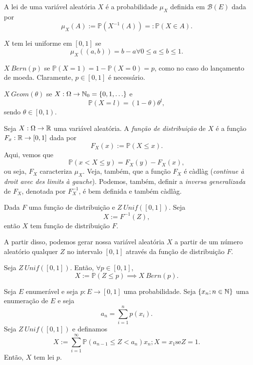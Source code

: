 A lei de uma variável aleatória $X$ é a probabilidade $\mu_X$ definida em $\mathcal{B}\left( E \right) $ dada por \[
\mu_X\left( A \right) := \mathbb{P}\left( X^{-1}\left( A \right)  \right) =: \mathbb{P}\left( X\in A \right) 
.\] 

\begin{eg}
    $X$ tem lei uniforme em $\left[ 0,1 \right] $ se \[
	\mu_X\left( (a,b) \right) = b-a \forall 0\le a\le b\le 1
    .\]
\end{eg}
\begin{eg}
    $X~Bern\left( p \right) $ se $ \mathbb{P}\left( X=1 \right) =1- \mathbb{P}\left( X=0 \right) =p$, como no caso do lançamento de moeda. Claramente, $p \in [0,1] $ é necessário.
\end{eg}
\begin{eg}
    $X ~ Geom\left( \theta \right) $ se $X:\Omega \to \mathbb{N}_0=\left\{ 0,1,\ldots \right\} $ e \[
    \mathbb{P}\left( X=l \right) = \left( 1-\theta \right) \theta^{l}
    ,\] sendo $\theta\in \left[ 0, 1 \right) $.
\end{eg}
\begin{eg}
    Seja $X:\Omega\to \mathbb{R}$ uma variável aleatória. A \emph{função de distribuição} de $X$ é a função $F_x:\mathbb{R}\to \left[ 0,1 \right] $ dada por \[
    F_X\left( x \right) := \mathbb{P}\left( X\le x \right) 
    .\] Aqui, vemos que \[
    \mathbb{P}\left( x<X\le y \right) = F_X(y) - F_X(x)
,\] ou seja, $F_X$ caracteriza $\mu_X$. Veja, também, que a função $F_X$ é càdlàg (\emph{continue à droit avec des limits à gauche}). Podemos, também, definir a \emph{inversa generalizada} de $F_X$, denotada por $F_X^{-1}$, é bem definida e também càdlàg.
\end{eg}

\begin{prop}
    Dada $F$ uma função de distribuição e $Z ~ Unif\left( \left[ 0,1 \right]  \right) $. Seja \[
    X:= F^{-1}\left( Z \right) 
    ,\] então $X$ tem função de distribuição $F$.
\end{prop}

A partir disso, podemos gerar nossa variável aleatória $X$ a partir de um número aleatório qualquer $Z$ no intervalo $\left[ 0,1 \right] $ através da função de distribuição $F$.

\begin{problem}
    Seja $Z ~ Unif\left( \left[ 0,1 \right]  \right) $. Então, $\forall p \in \left[ 0,1 \right] $, \[
    X:= \mathbb{P}\left( Z\le p \right) \implies X ~ Bern\left( p \right) 
    .\]
\end{problem}
\begin{problem}
    Seja $E$ enumerável e seja $p: E\to \left[ 0,1 \right] $ uma probabilidade. Seja $\left\{ x_n ; n\in \mathbb{N} \right\} $ uma enumeração de $E$ e seja \[
    a_n = \sum_{i=1}^{n} p\left( x_i \right) 
    .\] Seja $Z ~ Unif\left( \left[ 0,1 \right]  \right) $ e definamos \[
    X := \sum_{i=1}^{\infty} \mathbb{P}\left( a_{n-1}\le Z < a_n\right) x_n ; X = x_1 \text{se} Z = 1
    .\] Então, $X$ tem lei $p$.
\end{problem}


